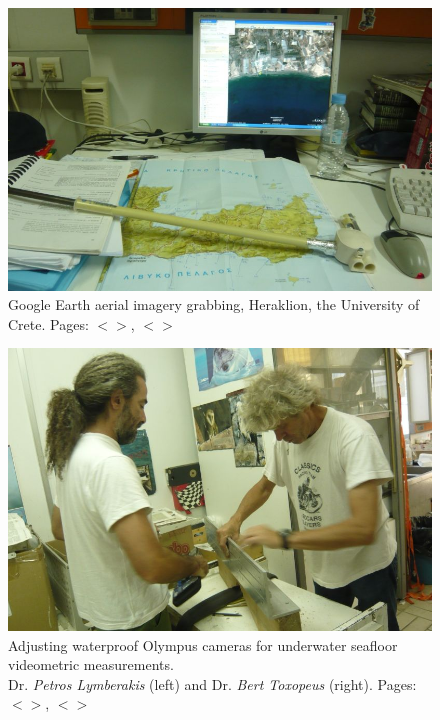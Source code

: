 \documentclass[11pt]{article}
\begin{document}
\begin{appendices}
\begin{figure}[H]
	\centering
	\includegraphics[scale=0.4]{photo-1.jpg}
	\caption{Google Earth aerial imagery grabbing, Heraklion, the University of Crete. Pages: $<$\pageref{GG-1}$>$, $<$\pageref{GG-2}$>$}
	\label{fig:A.50}
\end{figure}
\begin{figure}[H]
	\centering
	\includegraphics[scale=0.4]{photo-2.jpg}
	\caption{Adjusting waterproof Olympus cameras for underwater seafloor videometric measurements.\\Dr. \textit{Petros Lymberakis} (left) and Dr. \textit{Bert Toxopeus} (right). Pages: $<$\pageref{page-25}$>$, $<$\pageref{page-27}$>$}
	\label{fig:A.51}
\end{figure}


\end{appendices}
\end{document}
